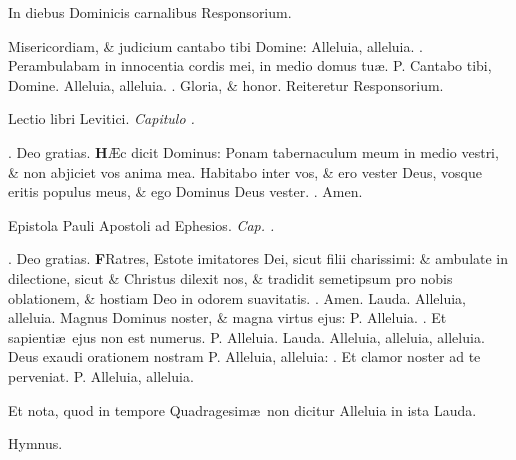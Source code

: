 \documentclass[letter,11pt]{book}
\makeatletter
\DeclareRobustCommand{\Vbar}{\vers@resp{-0.1em}{V}}
\DeclareRobustCommand{\Rbar}{\vers@resp{0pt}{R}}
\newcommand{\vers@resp@sym}{\raisebox{0.2ex}{\rotatebox[origin=c]{-20}{$\m@th\rceil$}}}
\newcommand{\vers@resp}[2]{%
  {\ooalign{\hidewidth\kern#1\vers@resp@sym\hidewidth\cr#2\cr}}%
}%
\def\P{\color{Red} P. \color{black}}
\def\V{\color{Red} \Vbar . \color{black}}
\def\R{\color{Red} \Rbar . \color{black}}
\makeatother
\begin{document}
\begin{multicols*}{2}
\vspace{-.75em} \begin{center} \color{Red} In diebus Dominicis carnalibus Responsorium. \end{center} \vspace{-.75em}
\par \noindent Misericordiam, \& judicium cantabo tibi Domine: Alleluia, alleluia. \V Perambulabam in innocentia cordis mei, in medio domus tu\ae . \P Cantabo tibi, Domine. Alleluia, alleluia. \V Gloria, \& honor. \color{Red} Reiteretur Responsorium. \color{black}
\vspace{-.5em} \begin{center} {\color{Red} L}ectio libri Levitici. \itshape Capitulo . \end{center} \vspace{-.5em}
\par \noindent \R Deo gratias.
\lettrine[lines=2]{\bfseries \color{Red} H}{}\AE c dicit Dominus: Ponam tabernaculum meum in medio vestri, \& non abjiciet vos anima mea. Habitabo inter vos, \& ero vester Deus, vosque eritis populus meus, \& ego Dominus Deus vester. \R Amen.
\vspace{-.5em} \begin{center} {\color{Red} E}pistola Pauli Apostoli ad Ephesios. \itshape Cap. . \end{center} \vspace{-.5em}
\par \noindent \R Deo gratias.
\lettrine[lines=2]{\bfseries \color{Red} F}{}Ratres, Estote imitatores Dei, sicut filii charissimi: \& ambulate in dilectione, sicut \& Christus dilexit nos, \& tradidit semetipsum pro nobis oblationem, \& hostiam Deo in odorem suavitatis. \R Amen.
\newline \color{Red} Lauda. \color{black} Alleluia, alleluia. Magnus Dominus noster, \& magna virtus ejus: \P Alleluia. \V Et sapienti\ae \ ejus non est numerus. \P Alleluia.
\newline \color{Red} Lauda. \color{black} Alleluia, alleluia, alleluia. Deus exaudi orationem nostram \P Alleluia, alleluia: \V Et clamor noster ad te perveniat. \P Alleluia, alleluia.
\par \color{Red} Et nota, quod in tempore Quadragesim\ae \ non dicitur \color{black} Alleluia \color{Red} in ista Lauda. \color{black}
\vspace{-.5em} \begin{center} \color{Red} Hymnus. \end{center} \vspace{-.5em}

\end{multicols*}
\end{document}
